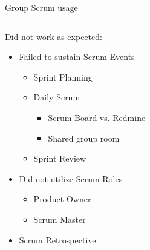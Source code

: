 \begin{frame}{Group Scrum usage}
  \begin{columns}
    \begin{column}{0.5\textwidth}
      Did not work as expected:
      \begin{itemize}
      	\item Failed to sustain Scrum Events
      			\begin{itemize}
      			\item Sprint Planning
      			\item Daily Scrum
       				\begin{itemize}
         				\item Scrum Board vs. Redmine
         				\item Shared group room
       				\end{itemize}
      			\item Sprint Review
      			\end{itemize}
        \item Did not utilize Scrum Roles
          \begin{itemize}
            \item Product Owner
            \item Scrum Master
          \end{itemize}
        \pause
        \item Scrum Retrospective
      \end{itemize}
    \end{column}
    

\end{columns}
\end{frame}
